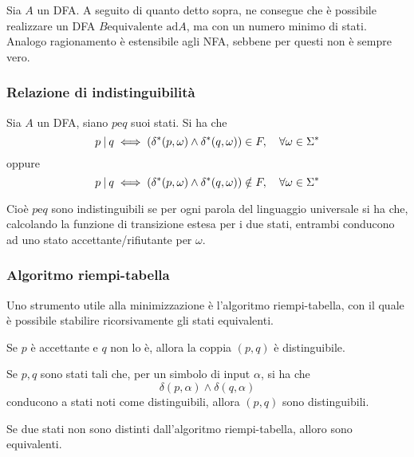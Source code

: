 \documentclass{subfiles}
\begin{document}
Sia \(A\) un DFA. A seguito di quanto detto sopra, ne consegue che è possibile realizzare un DFA \(B \text{equivalente ad} A\), ma con un numero minimo di stati.
Analogo ragionamento è estensibile agli NFA, sebbene per questi non è sempre vero.

\subsubsection{Relazione di indistinguibilità}
Sia \(A\) un DFA, siano \(p \text{e} q\) suoi stati. Si ha che
\[
    p \:{|}\: q \iff (\delta^{*}(p, \omega) \land \delta^{*}(q, \omega)) \in F, \quad \forall \omega \in \Sigma^{*}
\]
oppure
\[
    p \:{|}\: q \iff (\delta^{*}(p, \omega) \land \delta^{*}(q, \omega)) \notin F, \quad \forall \omega \in \Sigma^{*}
\]

\noindent Cioè \(p \text{e} q\) sono indistinguibili se per ogni parola del linguaggio universale si ha che, calcolando la funzione di transizione estesa per i due stati,
entrambi conducono ad uno stato accettante/rifiutante per \(\omega\).

\subsubsection{Algoritmo riempi-tabella}
Uno strumento utile alla minimizzazione è l'algoritmo riempi-tabella, con il quale è possibile stabilire ricorsivamente gli stati equivalenti.
\begin{Base*}
    Se \(p\) è accettante e \(q\) non lo è, allora la coppia \((p, q)\) è distinguibile.
\end{Base*}
\begin{Induction*}
    Se \(p, q\) sono stati tali che, per un simbolo di input \(\alpha\), si ha che
    \[
        \delta(p, \alpha) \land \delta(q, \alpha)
    \]
    conducono a stati noti come distinguibili, allora \((p, q)\) sono distinguibili.
\end{Induction*}

\begin{Theorem}
    Se due stati non sono distinti dall'algoritmo riempi-tabella, alloro sono equivalenti.
\end{Theorem}
\end{document}
